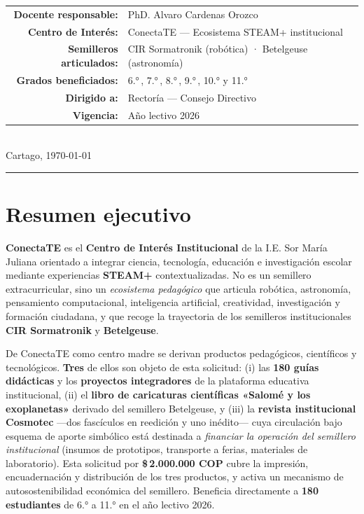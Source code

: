 \documentclass[12pt, letterpaper]{article}
\newcommand{\pesos}[1]{\$\,#1}
\newcommand{\conectate}{\textbf{ConectaTE}}
\begin{document}
\begin{center}
\begin{tabular}{r l}
\textbf{\color{smjAzul} Docente responsable:} & PhD. Alvaro Cardenas Orozco \\[2pt]
\textbf{\color{smjAzul} Centro de Interés:}   & ConectaTE — Ecosistema STEAM+ institucional \\[2pt]
\textbf{\color{smjAzul} Semilleros articulados:} & CIR Sormatronik (robótica) · Betelgeuse (astronomía) \\[2pt]
\textbf{\color{smjAzul} Grados beneficiados:} & 6.°{}\,, 7.°{}\,, 8.°{}\,, 9.°{}\,, 10.°{}{} y 11.°{} \\[2pt]
\textbf{\color{smjAzul} Dirigido a:}          & Rectoría — Consejo Directivo \\[2pt]
\textbf{\color{smjAzul} Vigencia:}            & Año lectivo 2026 \\
\end{tabular}\\[1.1cm]

{\normalsize\color{smjVino} Cartago, \today}\\[0.3cm]
{\color{smjAzul}\rule{\linewidth}{2.2pt}}
\end{center}

\newpage

\section*{Resumen ejecutivo}

\begin{cajaResumen}
\conectate{} es el \textbf{Centro de Interés Institucional} de la I.E. Sor María Juliana orientado a integrar ciencia, tecnología, educación e investigación escolar mediante experiencias \textbf{STEAM+} contextualizadas. No es un semillero extracurricular, sino un \textit{ecosistema pedagógico} que articula robótica, astronomía, pensamiento computacional, inteligencia artificial, creatividad, investigación y formación ciudadana, y que recoge la trayectoria de los semilleros institucionales \textbf{CIR Sormatronik} y \textbf{Betelgeuse}.

De ConectaTE como centro madre se derivan productos pedagógicos, científicos y tecnológicos. \textbf{Tres} de ellos son objeto de esta solicitud: (i) las \textbf{180 guías didácticas} y los \textbf{proyectos integradores} de la plataforma educativa institucional, (ii) el \textbf{libro de caricaturas científicas «Salomé y los exoplanetas»} derivado del semillero Betelgeuse, y (iii) la \textbf{revista institucional Cosmotec} —dos fascículos en reedición y uno inédito— cuya circulación bajo esquema de aporte simbólico está destinada a \textit{financiar la operación del semillero institucional} (insumos de prototipos, transporte a ferias, materiales de laboratorio). Esta solicitud por \textbf{\pesos{2.000.000} COP} cubre la impresión, encuadernación y distribución de los tres productos, y activa un mecanismo de autosostenibilidad económica del semillero. Beneficia directamente a \textbf{180 estudiantes} de 6.°{} a 11.°{} en el año lectivo 2026.
\end{cajaResumen}
\end{document}
